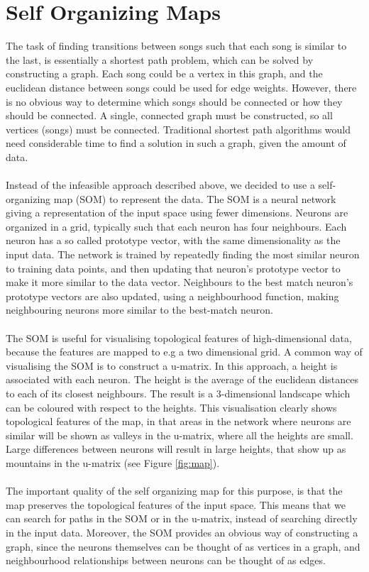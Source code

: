 \section{Self Organizing Maps} %
\label{sec:self_organizing_maps}
The task of finding transitions between songs such that each song is similar to the last, is essentially a shortest path problem, which can be solved by constructing a graph. Each song could be a vertex in this graph, and the euclidean distance between songs could be used for edge weights. However, there is no obvious way to determine which songs should be connected or how they should be connected. A single, connected graph must be constructed, so all vertices (songs) must be connected. Traditional shortest path algorithms would need considerable time to find a solution in such a graph, given the amount of data.
\\\\
Instead of the infeasible approach described above, we decided to use a self-organizing map (SOM) to represent the data. The SOM is a neural network giving a representation of the input space using fewer dimensions. Neurons are organized in a grid, typically such that each neuron has four neighbours. Each neuron has a so called prototype vector, with the same dimensionality as the input data. The network is trained by repeatedly finding the most similar neuron to training data points, and then updating that neuron's prototype vector to make it more similar to the data vector. Neighbours to the best match neuron's prototype vectors are also updated, using a neighbourhood function, making neighbouring neurons more similar to the best-match neuron.
\\\\
The SOM is useful for visualising topological features of high-dimensional data, because the features are mapped to e.g a two dimensional grid. A common way of visualising the SOM is to construct a u-matrix. In this approach, a height is associated with each neuron. The height is the average of the euclidean distances to each of its closest neighbours. The result is a 3-dimensional landscape which can be coloured with respect to the heights. This visualisation clearly shows topological features of the map, in that areas in the network where neurons are similar will be shown as valleys in the u-matrix, where all the heights are small. Large differences between neurons will result in large heights, that show up as mountains in the u-matrix (see Figure \ref{fig:map}).
\\\\
The important quality of the self organizing map for this purpose, is that the map preserves the topological features of the input space. This means that we can search for paths in the SOM or in the u-matrix, instead of searching directly in the input data. Moreover, the SOM provides an obvious way of constructing a graph, since the neurons themselves can be thought of as vertices in a graph, and neighbourhood relationships between neurons can be thought of as edges.

